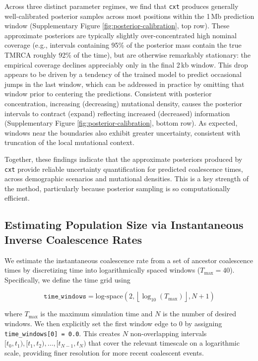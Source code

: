 \documentclass{article}
\newcommand{\cxtkit}{\texttt{cxt}\xspace}
\newcommand{\logspace}{\text{log-space}\xspace}
\begin{document}
Across three distinct parameter regimes, 
we find that \cxtkit produces generally well-calibrated posterior samples across
most positions within the 1\,Mb prediction window (Supplementary Figure \ref{fig:posterior-calibration}, top row). 
These approximate posteriors are typically slightly
over-concentrated high nominal coverage (e.g., intervals containing 95\% of the posterior mass contain the true
TMRCA roughly 92\% of the time), 
but are otherwise remarkably stationary: the empirical coverage declines appreciably only in the final 2\,kb window. 
This drop appears to be driven by a tendency of the trained model to predict occasional jumps in the last window,
which can be addressed in practice by omitting that window prior to centering the predictions. 
Consistent with posterior concentration,
increasing (decreasing) mutational density, causes the posterior intervals to contract (expand)
reflecting increased (decreased) information (Supplementary Figure \ref{fig:posterior-calibration}, bottom row). 
As expected, windows near the boundaries also exhibit greater uncertainty, consistent with truncation of the local mutational context.


Together, these findings indicate that the approximate posteriors produced by \cxtkit 
provide reliable uncertainty quantification for predicted coalescence times,
across demographic scenarios and mutational densities.
This is a key strength of the method, particularly because
posterior sampling is so computationally efficient.




\subsection*{Estimating Population Size via Instantaneous Inverse Coalescence Rates}
\label{app:ne}

We estimate the instantaneous coalescence rate from a set of ancestor coalescence times by discretizing time into logarithmically spaced windows ($T_{\max}=40$). Specifically, we define the time grid using

\[
\texttt{time\_windows} = \logspace\left(2, \left\lfloor \log_{10}(T_{\max}) \right\rfloor, N + 1 \right)
\]

where $T_{\max}$ is the maximum simulation time and $N$ is the number of desired windows. 
We then explicitly set the first window edge to 0 by assigning \texttt{time\_windows[0] = 0.0}. 
This creates $N$ non-overlapping intervals $[t_0, t_1), [t_1, t_2), \dots, [t_{N-1}, t_N)$ 
that cover the relevant timescale on a logarithmic scale, providing finer resolution for more recent coalescent events. 
\end{document}

